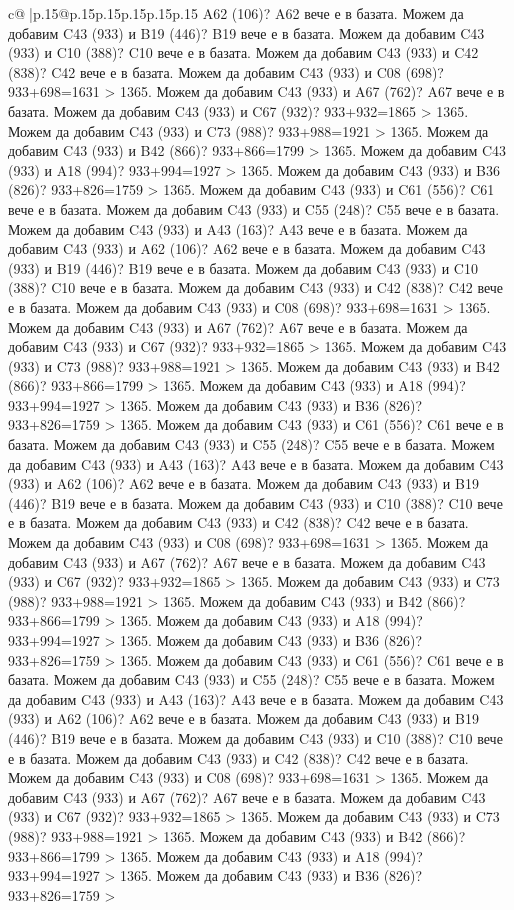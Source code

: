 \documentclass{article}
\begin{document}
{\begin{supertabular}{c@{$\;$}|p{.15\linewidth}@{}p{.15\linewidth}p{.15\linewidth}p{.15\linewidth}p{.15\linewidth}p{.15\linewidth}}
{{{A62 (106)? A62 вече е в базата. Можем да добавим C43 (933) и B19 (446)? B19 вече е в базата. Можем да добавим C43 (933) и C10 (388)? C10 вече е в базата. Можем да добавим C43 (933) и C42 (838)? C42 вече е в базата. Можем да добавим C43 (933) и C08 (698)? 933+698=1631 > 1365. Можем да добавим C43 (933) и A67 (762)? A67 вече е в базата. Можем да добавим C43 (933) и C67 (932)? 933+932=1865 > 1365. Можем да добавим C43 (933) и C73 (988)? 933+988=1921 > 1365. Можем да добавим C43 (933) и B42 (866)? 933+866=1799 > 1365. Можем да добавим C43 (933) и A18 (994)? 933+994=1927 > 1365. Можем да добавим C43 (933) и B36 (826)? 933+826=1759 > 1365. Можем да добавим C43 (933) и C61 (556)? C61 вече е в базата. Можем да добавим C43 (933) и C55 (248)? C55 вече е в базата. Можем да добавим C43 (933) и A43 (163)? A43 вече е в базата. Можем да добавим C43 (933) и A62 (106)? A62 вече е в базата. Можем да добавим C43 (933) и B19 (446)? B19 вече е в базата. Можем да добавим C43 (933) и C10 (388)? C10 вече е в базата. Можем да добавим C43 (933) и C42 (838)? C42 вече е в базата. Можем да добавим C43 (933) и C08 (698)? 933+698=1631 > 1365. Можем да добавим C43 (933) и A67 (762)? A67 вече е в базата. Можем да добавим C43 (933) и C67 (932)? 933+932=1865 > 1365. Можем да добавим C43 (933) и C73 (988)? 933+988=1921 > 1365. Можем да добавим C43 (933) и B42 (866)? 933+866=1799 > 1365. Можем да добавим C43 (933) и A18 (994)? 933+994=1927 > 1365. Можем да добавим C43 (933) и B36 (826)? 933+826=1759 > 1365. Можем да добавим C43 (933) и C61 (556)? C61 вече е в базата. Можем да добавим C43 (933) и C55 (248)? C55 вече е в базата. Можем да добавим C43 (933) и A43 (163)? A43 вече е в базата. Можем да добавим C43 (933) и A62 (106)? A62 вече е в базата. Можем да добавим C43 (933) и B19 (446)? B19 вече е в базата. Можем да добавим C43 (933) и C10 (388)? C10 вече е в базата. Можем да добавим C43 (933) и C42 (838)? C42 вече е в базата. Можем да добавим C43 (933) и C08 (698)? 933+698=1631 > 1365. Можем да добавим C43 (933) и A67 (762)? A67 вече е в базата. Можем да добавим C43 (933) и C67 (932)? 933+932=1865 > 1365. Можем да добавим C43 (933) и C73 (988)? 933+988=1921 > 1365. Можем да добавим C43 (933) и B42 (866)? 933+866=1799 > 1365. Можем да добавим C43 (933) и A18 (994)? 933+994=1927 > 1365. Можем да добавим C43 (933) и B36 (826)? 933+826=1759 > 1365. Можем да добавим C43 (933) и C61 (556)? C61 вече е в базата. Можем да добавим C43 (933) и C55 (248)? C55 вече е в базата. Можем да добавим C43 (933) и A43 (163)? A43 вече е в базата. Можем да добавим C43 (933) и A62 (106)? A62 вече е в базата. Можем да добавим C43 (933) и B19 (446)? B19 вече е в базата. Можем да добавим C43 (933) и C10 (388)? C10 вече е в базата. Можем да добавим C43 (933) и C42 (838)? C42 вече е в базата. Можем да добавим C43 (933) и C08 (698)? 933+698=1631 > 1365. Можем да добавим C43 (933) и A67 (762)? A67 вече е в базата. Можем да добавим C43 (933) и C67 (932)? 933+932=1865 > 1365. Можем да добавим C43 (933) и C73 (988)? 933+988=1921 > 1365. Можем да добавим C43 (933) и B42 (866)? 933+866=1799 > 1365. Можем да добавим C43 (933) и A18 (994)? 933+994=1927 > 1365. Можем да добавим C43 (933) и B36 (826)? 933+826=1759 > }}}
\end{supertabular}}
\end{document}
